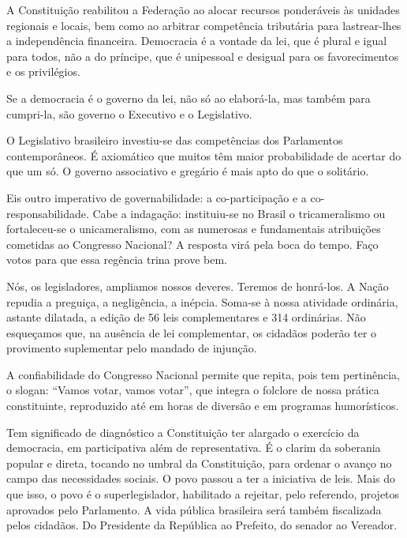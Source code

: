 A Constituição reabilitou a Federação ao alocar recursos ponderáveis às
unidades regionais e locais, bem como ao arbitrar competência tributária
para lastrear-lhes a independência financeira. Democracia é a vontade da
lei, que é plural e igual para todos, não a do príncipe, que é
unipessoal e desigual para os favorecimentos e os privilégios.

Se a democracia é o governo da lei, não só ao elaborá-la, mas também
para cumpri-la, são governo o Executivo e o Legislativo.

O Legislativo brasileiro investiu-se das competências dos Parlamentos
contemporâneos. É axiomático que muitos têm maior probabilidade de
acertar do que um só. O governo associativo e gregário é mais apto do
que o solitário.

Eis outro imperativo de governabilidade: a co-participação e a
co-responsabilidade. Cabe a indagação: instituiu-se no Brasil o
tricameralismo ou fortaleceu-se o unicameralismo, com as numerosas e
fundamentais atribuições cometidas ao Congresso Nacional? A resposta
virá pela boca do tempo. Faço votos para que essa regência trina prove
bem.

Nós, os legisladores, ampliamos nossos deveres. Teremos de honrá-los. A
Nação repudia a preguiça, a negligência, a inépcia. Soma-se à nossa
atividade ordinária, astante dilatada, a edição de 56 leis
complementares e 314 ordinárias. Não esqueçamos que, na ausência de lei
complementar, os cidadãos poderão ter o provimento suplementar pelo
mandado de injunção.

A confiabilidade do Congresso Nacional permite que repita, pois tem
pertinência, o slogan: ``Vamos votar, vamos votar'', que integra o
folclore de nossa prática constituinte, reproduzido até em horas de
diversão e em programas humorísticos.

Tem significado de diagnóstico a Constituição ter alargado o exercício
da democracia, em participativa além de representativa. É o clarim da
soberania popular e direta, tocando no umbral da Constituição, para
ordenar o avanço no campo das necessidades sociais. O povo passou a ter
a iniciativa de leis. Mais do que isso, o povo é o superlegislador,
habilitado a rejeitar, pelo referendo, projetos aprovados pelo
Parlamento. A vida pública brasileira será também fiscalizada pelos
cidadãos. Do Presidente da República ao Prefeito, do senador ao
Vereador.

